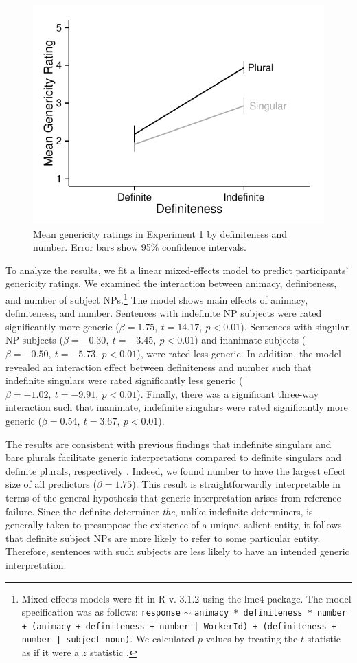 \documentclass[10pt,letterpaper]{article}
\begin{document}
\begin{figure}[t]
\centering
\includegraphics[width=.8\linewidth]{figures/e1.pdf}
\caption{\label{fig:e1} Mean genericity ratings in Experiment 1 by definiteness and number. Error bars show 95\% confidence intervals.}
\end{figure}

To analyze the results, we fit a linear mixed-effects model to predict participants' genericity ratings. We examined the interaction between animacy, definiteness, and number of subject NPs.\footnote{Mixed-effects models were fit in R v. 3.1.2 using the lme4 package. The model specification was as follows: \texttt{response} \(\sim\) \texttt{animacy * definiteness * number + (animacy + definiteness + number | WorkerId) + (definiteness + number | subject noun)}. We calculated \(p\) values by treating the \(t\) statistic as if it were a \(z\) statistic \cite{Barr:2013}.} The model shows main effects of animacy, definiteness, and number. Sentences with indefinite NP subjects were rated significantly more generic (\(\beta = 1.75,~t = 14.17,~p < 0.01\)). Sentences with singular NP subjects (\(\beta = -0.30,~t = -3.45,~p < 0.01\)) and inanimate subjects (\(\beta = -0.50,~t = -5.73,~p < 0.01\)), were rated less generic. In addition, the model revealed an interaction effect between definiteness and number such that indefinite singulars were rated significantly less generic (\(\beta = -1.02,~t = -9.91,~p < 0.01\)). Finally, there was a significant three-way interaction such that inanimate, indefinite singulars were rated significantly more generic (\(\beta = 0.54,~t = 3.67,~p < 0.01\)).

The results are consistent with previous findings that indefinite singulars and bare plurals facilitate generic interpretations compared to definite singulars and definite plurals, respectively \cite{Cimpian:2011, Gelman:2003}. Indeed, we found number to have the largest effect size of all predictors (\(\beta = 1.75\)). This result is straightforwardly interpretable in terms of the general hypothesis that generic interpretation arises from reference failure. Since the definite determiner \textit{the}, unlike indefinite determiners, is generally taken to presuppose the existence of a unique, salient entity, it follows that definite subject NPs are more likely to refer to some particular entity. Therefore, sentences with such subjects are less likely to have an intended generic interpretation.
\end{document}
